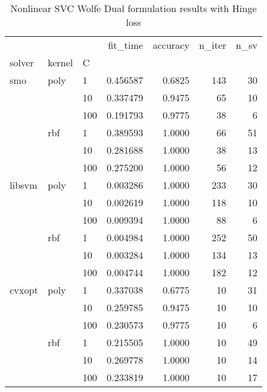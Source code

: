 \begin{table}[H]
\centering
\caption{Nonlinear SVC Wolfe Dual formulation results with Hinge loss}
\label{nonlinear_dual_l1_svc_cv_results}
\begin{tabular}{lllrrrr}
\toprule
       &     &     &  fit\_time &  accuracy &  n\_iter &  n\_sv \\
solver & kernel & C &           &           &         &       \\
\midrule
smo & poly & 1   &  0.456587 &    0.6825 &     143 &    30 \\
       &     & 10  &  0.337479 &    0.9475 &      65 &    10 \\
       &     & 100 &  0.191793 &    0.9775 &      38 &     6 \\
       & rbf & 1   &  0.389593 &    1.0000 &      66 &    51 \\
       &     & 10  &  0.281688 &    1.0000 &      38 &    13 \\
       &     & 100 &  0.275200 &    1.0000 &      56 &    12 \\
libsvm & poly & 1   &  0.003286 &    1.0000 &     233 &    30 \\
       &     & 10  &  0.002619 &    1.0000 &     118 &    10 \\
       &     & 100 &  0.009394 &    1.0000 &      88 &     6 \\
       & rbf & 1   &  0.004984 &    1.0000 &     252 &    50 \\
       &     & 10  &  0.003284 &    1.0000 &     134 &    13 \\
       &     & 100 &  0.004744 &    1.0000 &     182 &    12 \\
cvxopt & poly & 1   &  0.337038 &    0.6775 &      10 &    31 \\
       &     & 10  &  0.259785 &    0.9475 &      10 &    10 \\
       &     & 100 &  0.230573 &    0.9775 &      10 &     6 \\
       & rbf & 1   &  0.215505 &    1.0000 &      10 &    49 \\
       &     & 10  &  0.269778 &    1.0000 &      10 &    14 \\
       &     & 100 &  0.233819 &    1.0000 &      10 &    17 \\
\bottomrule
\end{tabular}
\end{table}
